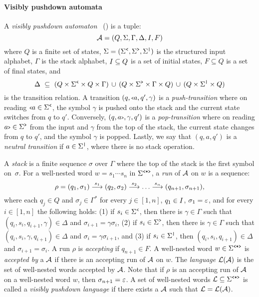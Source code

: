 \paragraph{Visibly pushdown automata} A \emph{visibly pushdown automaton}~\cite{AlurM04} (\vpa) is a tuple:
$$
\mathcal{A} = (Q, \Sigma, \Gamma, \Delta, I, F)
$$ 
where $Q$ is a finite set of states, $\Sigma = (\Sigma^{\texttt{<}}, \Sigma^{\texttt{>}}, \Sigma^{\texttt{|}})$ is the structured input alphabet, $\Gamma$ is the stack alphabet, $I \subseteq Q$ is a set of initial states, $F\subseteq Q$ is a set of final states, and
$$
\Delta \ \subseteq \ (Q\times\opS\times Q\times\Gamma) \,\cup \, (Q\times\clS\times\Gamma\times Q) \, \cup \, (Q\times\noS\times Q)
$$ 
is the transition relation.
A transition $(q,{\scriptsize\texttt{<}} a,q',\gamma)$ is a {\em push-transition} where on reading ${\scriptsize\texttt{<}} a\in\Sigma^{\texttt{<}}$, the symbol $\gamma$ is pushed onto the stack and the current state switches from $q$ to $q'$. Conversely, $(q,a{\scriptsize\texttt{>}},\gamma,q')$ is a {\em pop-transition} where on reading $a{\scriptsize\texttt{>}}\in\Sigma^{\texttt{>}}$ from the input and $\gamma$ from the top of the stack, the current state changes from $q$ to $q'$, and the symbol $\gamma$ is popped. Lastly, we say that $(q,a,q')$ is a {\em neutral transition} if $a\in\Sigma^{\texttt{|}}$, where there is no stack operation.

A \emph{stack} is a finite sequence $\sigma$ over $\Gamma$ where the top of the stack is the first symbol on~$\sigma$. For a well-nested word $w = s_1 \cdots s_n$ in $\Sigma^{\texttt{<*>}}$, a \emph{run} of $\mathcal{A}$ on $w$ is a sequence:
$$
\rho = (q_1,\sigma_1) \overset{s_1}{\longrightarrow} (q_2,\sigma_2) \overset{s_2}{\longrightarrow} \ldots \overset{s_n}{\longrightarrow} (q_{n+1},\sigma_{n+1}),
$$ 
where each $q_j \in Q$ and $\sigma_j\in\Gamma^{*}$ for every $j\in[1,n]$, $q_1\in I$, $\sigma_1 = \varepsilon$, and for every $i\in[1,n]$ the following holds: 
(1) if $s_{i}\in\Sigma^{\texttt{<}}$, then there is $\gamma\in\Gamma$ such that $(q_i,s_{i},q_{i+1},\gamma) \in \Delta$ and $\sigma_{i+1} = \gamma\sigma_i$, 
(2) if $s_{i}\in\Sigma^{\texttt{>}}$, then there is $\gamma\in\Gamma$ such that $(q_i,s_{i},\gamma,q_{i+1}) \in \Delta$ and $\sigma_{i} = \gamma\sigma_{i+1}$, and
(3) if $s_{i}\in\Sigma^{\texttt{|}}$, then $(q_i,s_{i},q_{i+1}) \in \Delta$ and $\sigma_{i+1} = \sigma_i$.
A run $\rho$ is \emph{accepting} if $q_{n+1}\in F$. A well-nested word $w\in\Sigma^{\texttt{<*>}}$ is \emph{accepted by} a \vpa $\mathcal{A}$ if there is an accepting run of $\mathcal{A}$ on $w$. The \emph{language} $\mathcal{L}(\mathcal{A})$ is the set of well-nested words accepted by $\mathcal{A}$. Note that if $\rho$ is an accepting run of $\mathcal{A}$ on a well-nested word $w$, then $\sigma_{n+1} = \varepsilon$. A set of well-nested words $\mathcal{L} \subseteq \Sigma^{\texttt{<*>}}$ is called a \emph{visibly pushdown language} if there exists a \vpa $\mathcal{A}$ such that $\mathcal{L} = \mathcal{L}(\mathcal{A})$.

